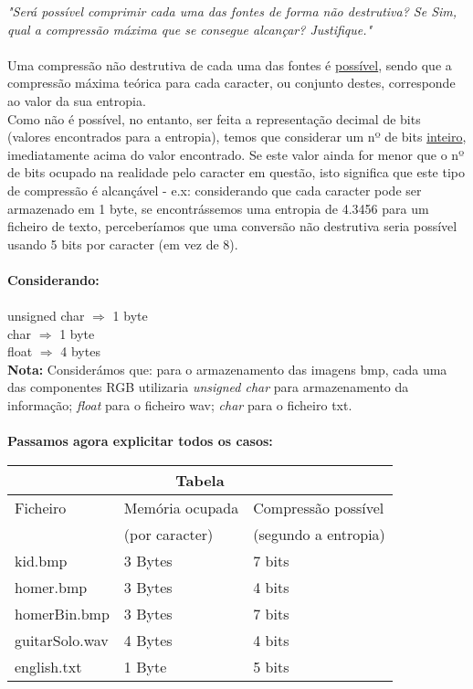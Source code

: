 \documentclass{article}
\begin{document}
\textit{"Será possível comprimir cada uma das fontes de forma não destrutiva? Se Sim, qual a compressão máxima que se consegue alcançar? Justifique."}\\\\
Uma compressão não destrutiva de cada uma das fontes é \underline{possível}, sendo que a compressão máxima teórica para cada caracter, ou conjunto destes, corresponde ao valor da sua entropia.\\Como não é possível, no entanto, ser feita a representação decimal de bits (valores encontrados para a entropia), temos que considerar um nº de bits \underline{inteiro}, imediatamente acima do valor encontrado. Se este valor ainda for menor que o nº de bits ocupado na realidade pelo caracter em questão, isto significa que este tipo de compressão é alcançável - e.x: considerando que cada caracter pode ser armazenado em 1 byte, se encontrássemos uma entropia de 4.3456 para um ficheiro de texto, perceberíamos que uma conversão não destrutiva seria possível usando 5 bits por caracter (em vez de 8).\\\\
\textbf{Considerando:}\\\\
unsigned char $\Rightarrow$ 1 byte\\
char $\Rightarrow$ 1 byte\\
float $\Rightarrow$ 4 bytes\\
\newpage
\textbf{Nota:} Considerámos que: para o armazenamento das imagens bmp, cada uma das componentes RGB utilizaria \textit{unsigned char} para armazenamento da informação; \textit{float} para o ficheiro wav; \textit{char} para o ficheiro txt.\\\\
\textbf{Passamos agora explicitar todos os casos:}

\begin{center}
\begin{tabular}{|p{1.0in}|p{1.1in}|p{1.3in}|}
\hline
\multicolumn{3}{|c|}{Tabela}\\ \hline
Ficheiro&Memória ocupada&Compressão possível \\
&(por caracter)&(segundo a entropia)\\ \hline
kid.bmp&3 Bytes&7 bits\\ \hline
homer.bmp&3 Bytes&4 bits\\ \hline
homerBin.bmp&3 Bytes&7 bits\\ \hline
guitarSolo.wav&4 Bytes&4 bits\\ \hline
english.txt&1 Byte&5 bits\\ \hline
\end{tabular}
\end{center} 
\end{document}
